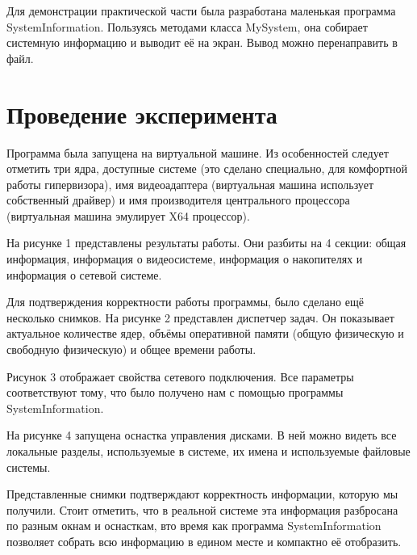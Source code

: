 \documentclass[a4paper, 12pt]{report}		%
\begin{document}
\vspace{1em}

Для демонстрации практической части была разработана маленькая программа SystemInformation. Пользуясь методами класса MySystem, она собирает системную информацию и выводит её на экран. Вывод можно перенаправить в файл.

\section*{Проведение эксперимента}

Программа была запущена на виртуальной машине. Из особенностей следует отметить три ядра, доступные системе (это сделано специально, для комфортной работы гипервизора), имя видеоадаптера (виртуальная машина использует собственный драйвер) и имя производителя центрального процессора (виртуальная машина эмулирует X64 процессор).
\vspace{1em}

На рисунке 1 представлены результаты работы. Они разбиты на 4 секции: общая информация, информация о видеосистеме, информация о накопителях и информация о сетевой системе.
\vspace{1em}

Для подтверждения корректности работы программы, было сделано ещё несколько снимков. На рисунке 2 представлен диспетчер задач. Он показывает актуальное количестве ядер, объёмы оперативной памяти (общую физическую и свободную физическую) и общее времени работы.
\vspace{1em}

Рисунок 3 отображает свойства сетевого подключения. Все параметры соответствуют тому, что было получено нам с помощью программы SystemInformation.
\vspace{1em}

На рисунке 4 запущена оснастка управления дисками. В ней можно видеть все локальные разделы, используемые в системе, их имена и используемые файловые системы.
\vspace{1em}

Представленные снимки подтверждают корректность информации, которую мы получили. Стоит отметить, что в реальной системе эта информация разбросана по разным окнам и оснасткам, вто время как программа SystemInformation позволяет собрать всю информацию в едином месте и компактно её отобразить.
\vspace{1em}
\end{document}
